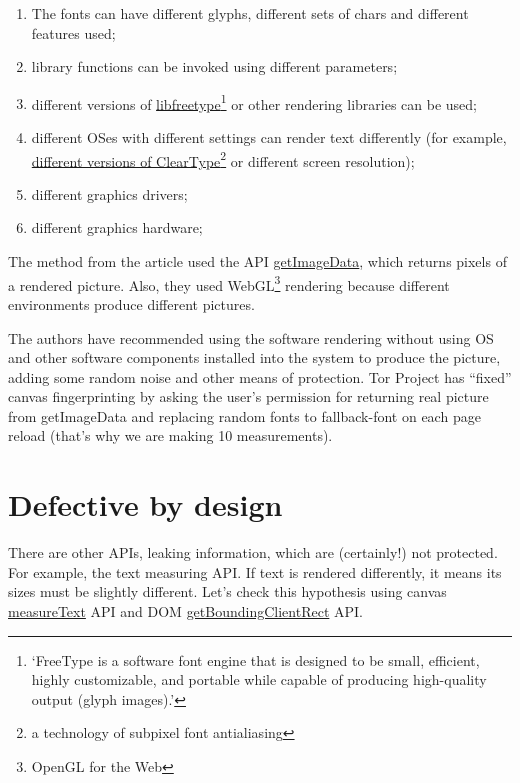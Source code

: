 \documentclass[letterpaper,14pt]{article}
\begin{document}
\begin{enumerate}
\itemsep1pt\parskip0pt
\item
  The fonts can have different glyphs, different sets of chars and different features used;
\item
  library functions can be invoked using different parameters;
\item
  different versions of \href{https://www.freetype.org/}{libfreetype}\footnote{`FreeType is a software font engine that is designed to be small, efficient, highly customizable, and portable while capable of producing high-quality output (glyph images).'} or other rendering libraries can be used;
\item
  different OSes with different settings can render text differently (for example, \href{https://habr.com/post/247703/}{different versions of ClearType\texttrademark\footnote{a technology of subpixel font antialiasing}} or different screen resolution);
\item
  different graphics drivers;
\item
  different graphics hardware;
\end{enumerate}

The method from the article used the API \href{https://developer.mozilla.org/en-US/docs/Web/API/CanvasRenderingContext2D.getImageData}{getImageData}, which returns pixels of a rendered picture. Also, they used WebGL\footnote{OpenGL for the Web} rendering because different environments produce different pictures.

The authors have recommended using the software rendering without using OS and other software components installed into the system to produce the picture, adding some random noise and other means of protection. Tor Project has ``fixed'' canvas fingerprinting by asking the user's permission for returning real picture from getImageData and replacing random fonts to fallback-font on each page reload (that's why we are making 10 measurements).

\section{Defective by design}\label{defective-by-design}

There are other APIs, leaking information, which are (certainly!) not protected. For example, the text measuring API. If text is rendered differently, it means its sizes must be slightly different. Let's check this hypothesis using canvas \href{https://developer.mozilla.org/en-US/docs/Web/API/CanvasRenderingContext2D.measureText}{measureText} API and DOM \href{https://developer.mozilla.org/en-US/docs/Web/API/Element.getBoundingClientRect}{getBoundingClientRect} API.
\end{document}
